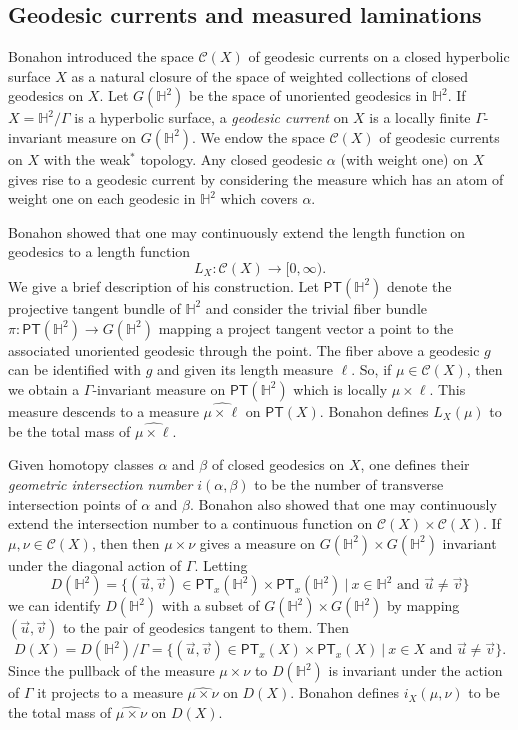 \documentclass{amsart}
\theoremstyle{plain}
\theoremstyle{definition}
\theoremstyle{remark}
\newcommand{\Hp}{{\mathbb H}^2}
\renewcommand{\sf}[1]{{\mathsf{#1}}}
\newcommand{\<}{\left <}
\renewcommand{\>}{\right >}
\begin{document}
\subsection{Geodesic currents and measured laminations}
\label{currents}
Bonahon \cite{bonahon-currents} introduced the space  $\mathcal C(X)$ of geodesic currents  on a closed hyperbolic surface $X$
as a natural closure of the space of   weighted collections of  closed geodesics on $X$.
Let $G(\Hp)$ be the space of unoriented geodesics in $\Hp$.  
If $X = \Hp/\Gamma$ is a hyperbolic surface, a {\em geodesic current} on $X$ is a locally finite $\Gamma$-invariant measure on $G(\Hp)$. 
We endow the space $\mathcal C(X)$ of geodesic currents on $X$  with the weak$^*$ topology.
Any closed geodesic $\alpha$ (with weight one) on $X$ gives rise to a geodesic current by considering the measure which has an
atom of weight one on each geodesic in $\mathbb H^2$ which covers $\alpha$.

Bonahon \cite{bonahon-currents} showed that one may continuously extend the length function on geodesics to a length
function
$$L_X:\mathcal C(X)\to [0,\infty).$$
We give a brief description of his construction.
Let $\sf{PT}(\Hp)$ denote the projective tangent bundle of $\Hp$ and consider  the  trivial fiber bundle 
$\pi:\sf{PT}(\Hp) \rightarrow G(\Hp)$ mapping a project  tangent vector a point  to the associated unoriented geodesic through the point.
The fiber above a geodesic $g$ can be identified with $g$ and given its length measure $\ell$. So, if $\mu\in \mathcal C(X)$, then we
obtain a $\Gamma$-invariant measure on $\sf{PT}(\Hp)$ which is locally $\mu\times\ell$. This measure
descends to a measure $\widehat{\mu\times\ell}$ on $\sf{PT}(X)$. Bonahon defines $L_X(\mu)$ to be the total mass of
$\widehat{\mu\times\ell}$.


Given homotopy classes  $\alpha$ and $\beta$ of closed geodesics on $X$, one defines their
{\em geometric intersection number} $i(\alpha,\beta)$ to be the number of transverse intersection points of $\alpha$ and $\beta$.
Bonahon also showed that one may continuously extend the intersection number to a continuous function on $\mathcal C(X)\times\mathcal C(X)$.
If $\mu,\nu\in \mathcal C(X)$, then
then $\mu\times\nu$ gives a  measure on $G(\Hp)\times G(\Hp)$ invariant under the diagonal action of $\Gamma$. Letting 
$$D(\Hp) = \{(\vec u,\vec v) \in \sf{PT}_x(\Hp)\times \sf{PT}_x(\Hp)\ |\ x\in\mathbb H^2\text{ and } \vec u \neq \vec v\}$$
we can identify $D(\Hp)$ with a subset of $G(\Hp)\times G(\Hp)$ by mapping $(\vec u,\vec v)$ to the pair of geodesics tangent to them. Then
$$D(X)  = D(\Hp)/\Gamma =  \{(\vec u,\vec v) \in \sf{PT}_x(X)\times \sf{PT}_x(X)\ | \ x\in X\text{ and } \vec u \neq \vec v\}.$$
Since the pullback of the  measure $\mu\times\nu$ to $D(\Hp)$ is invariant under the action of $\Gamma$ it projects to
a measure $\widehat{\mu\times\nu}$ on $D(X)$. Bonahon defines
$i_X(\mu,\nu)$  to be the total mass of $\widehat{\mu\times\nu}$ on $D(X)$.
\end{document}
